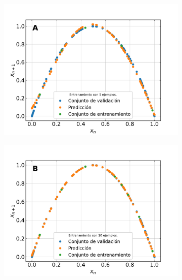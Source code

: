 \documentclass[11pt,twocolumn,twoside]{opticajnl}
\begin{document}
\begin{figure}[ht]
    \centering
         \begin{subfigure}[b]{0.3\linewidth}
            \centering
            \includegraphics[width=\textwidth]{Figuras/logmap_5_tests_ej3.pdf}
         \end{subfigure}
         \begin{subfigure}[b]{0.3\linewidth}
            \centering
            \includegraphics[width=\textwidth]{Figuras/logmap_10_tests_ej3.pdf}
         \end{subfigure}
         \begin{subfigure}[b]{0.3\linewidth}
            \centering

\end{subfigure}
\end{figure}
\end{document}
